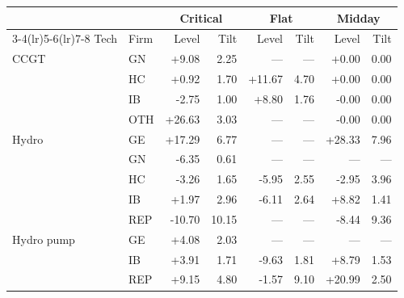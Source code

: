 \begin{tabular}{l l r r r r r r}
\toprule
 & & \multicolumn{2}{c}{Critical} & \multicolumn{2}{c}{Flat} & \multicolumn{2}{c}{Midday} \\
\cmidrule(lr){3-4}\cmidrule(lr){5-6}\cmidrule(lr){7-8}
Tech & Firm & Level & Tilt & Level & Tilt & Level & Tilt \\
\midrule
CCGT & GN & +9.08 & 2.25 & --- & --- & +0.00 & 0.00 \\
 & HC & +0.92 & 1.70 & +11.67 & 4.70 & +0.00 & 0.00 \\
 & IB & -2.75 & 1.00 & +8.80 & 1.76 & -0.00 & 0.00 \\
 & OTH & +26.63 & 3.03 & --- & --- & -0.00 & 0.00 \\
\addlinespace
Hydro & GE & +17.29 & 6.77 & --- & --- & +28.33 & 7.96 \\
 & GN & -6.35 & 0.61 & --- & --- & --- & --- \\
 & HC & -3.26 & 1.65 & -5.95 & 2.55 & -2.95 & 3.96 \\
 & IB & +1.97 & 2.96 & -6.11 & 2.64 & +8.82 & 1.41 \\
 & REP & -10.70 & 10.15 & --- & --- & -8.44 & 9.36 \\
\addlinespace
Hydro pump & GE & +4.08 & 2.03 & --- & --- & --- & --- \\
 & IB & +3.91 & 1.71 & -9.63 & 1.81 & +8.79 & 1.53 \\
 & REP & +9.15 & 4.80 & -1.57 & 9.10 & +20.99 & 2.50 \\
\bottomrule
\end{tabular}